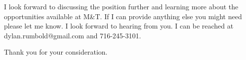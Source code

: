 \documentclass[11pt, letterpaper]{awesome-cv}
\begin{document}
\begin{cvletter}
I look forward to discussing the position further and learning more about the opportunities available at M\&T. If I can provide anything else you might need please let me know. I look forward to hearing from you. I can be reached at dylan.rumbold@gmail.com and 716-245-3101.

Thank you for your consideration.



\end{cvletter}


\makeletterclosing
\end{document}
